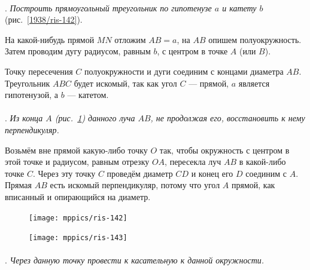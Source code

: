 \documentclass[twoside]{book}
\begin{document}
\paragraph{}\label{1938/126}
.
\emph{Построить прямоугольный треугольник по гипотенузе $a$ и катету $b$} (рис.~\ref{1938/ris-142}).


На какой-нибудь прямой $MN$ отложим $AB=a$, на $AB$ опишем полуокружность.
Затем проводим дугу радиусом, равным $b$, с центром в точке $A$ (или $B$).

Точку пересечения $C$ полуокружности и дуги соединим с концами диаметра $AB$.
Треугольник $ABC$ будет искомый, так как угол $C$ — прямой, $a$ является гипотенузой, а $b$ — катетом.


\paragraph{}\label{1938/127}
.
\emph{Из конца $A$ \emph{(рис.~\ref{1938/ris-143})} данного луча $AB$, не продолжая его, восстановить к нему перпендикуляр.}

Возьмём вне прямой какую-либо точку $O$ так, чтобы окружность с центром в этой точке и радиусом, равным отрезку $OA$, пересекла луч $AB$ в какой-либо точке $C$.
Через эту точку $C$ проведём диаметр $CD$ и конец его $D$ соединим с $A$.
Прямая $AB$ есть искомый перпендикуляр, потому что угол $A$ прямой, как вписанный и опирающийся на диаметр.

\begin{figure}[h]
\begin{minipage}{.48\textwidth}
\centering
\texttt{[image: mppics/ris-142]}
\end{minipage}
\hfill
\begin{minipage}{.48\textwidth}
\centering
\texttt{[image: mppics/ris-143]}
\end{minipage}

\medskip

\begin{minipage}{.48\textwidth}
\centering
\caption{}\label{1938/ris-142}
\end{minipage}
\hfill
\begin{minipage}{.48\textwidth}
\centering
\caption{}\label{1938/ris-143}
\end{minipage}
\vskip-4mm
\end{figure}

\paragraph{}\label{1938/128}
.
\emph{Через данную точку провести к касательную к данной окружности.}
\end{document}
